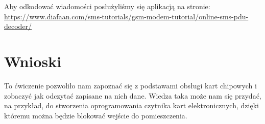 \documentclass{article}
\begin{document}
Aby odkodować wiadomości posłużyliśmy się aplikacją na stronie: \url{https://www.diafaan.com/sms-tutorials/gsm-modem-tutorial/online-sms-pdu-decoder/}
\section{Wnioski}
To ćwiczenie pozwoliło nam zapoznać się z podstawami obsługi kart chipowych i zobaczyć jak odczytać zapisane na nich dane. Wiedza taka może nam się przydać, na przykład, do stworzenia oprogramowania czytnika kart elektronicznych, dzięki któremu można będzie blokować wejście do pomieszczenia.


\end{document}
